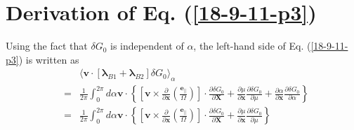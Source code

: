 \documentclass{llncs}
\newcommand{\tmmathbf}[1]{\ensuremath{\boldsymbol{#1}}}
\begin{document}
\section{Derivation of Eq. (\ref{18-9-11-p3})}\label{21-8-25-p1}

Using the fact that $\delta G_0$ is independent of $\alpha$, the left-hand
side of Eq. (\ref{18-9-11-p3}) is written as
\begin{eqnarray*}
  &  & \langle \mathbf{v} \cdot [\tmmathbf{\lambda}_{B 1}
  +\tmmathbf{\lambda}_{B 2}] \delta G_0 \rangle_{\alpha}\\
  & = & \frac{1}{2 \pi} \int_0^{2 \pi} d \alpha \mathbf{v} \cdot \left\{
  \left[ \mathbf{v} \times \frac{\partial}{\partial \mathbf{x}} \left(
  \frac{\tmmathbf{e}_{\parallel}}{\Omega} \right) \right] \cdot \frac{\partial
  \delta G_0}{\partial \mathbf{X}} + \frac{\partial \mu}{\partial \mathbf{x}} 
  \frac{\partial \delta G_0}{\partial \mu} + \frac{\partial \alpha}{\partial
  \mathbf{x}}  \frac{\partial \delta G_0}{\partial \alpha} \right\}\\
  & = & \frac{1}{2 \pi} \int_0^{2 \pi} d \alpha \mathbf{v} \cdot \left\{
  \left[ \mathbf{v} \times \frac{\partial}{\partial \mathbf{x}} \left(
  \frac{\tmmathbf{e}_{\parallel}}{\Omega} \right) \right] \cdot \frac{\partial
  \delta G_0}{\partial \mathbf{X}} + \frac{\partial \mu}{\partial \mathbf{x}} 
  \frac{\partial \delta G_0}{\partial \mu} \right\}
\end{eqnarray*}


\
\end{document}
